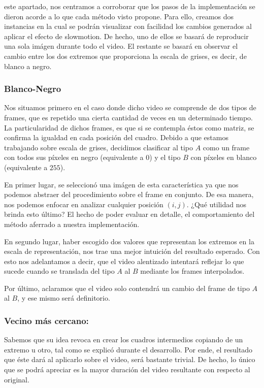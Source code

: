  este apartado, nos centramos a corroborar que los pasos de la implementaci\'on se dieron acorde a lo que cada m\'etodo visto propone. Para ello, creamos dos instancias en la cual se podr\'an visualizar con facilidad los cambios generados al aplicar el efecto de slowmotion. De hecho, uno de ellos se basar\'a de reproducir una sola im\'agen durante todo el video. El restante se basar\'a en observar el cambio entre los dos extremos que proporciona la escala de grises, es decir, de blanco a negro.
\subsubsection{Blanco-Negro}

Nos situamos primero en el caso donde dicho video se comprende de dos tipos de frames, que es repetido una cierta cantidad de veces en un determinado tiempo. La particularidad de dichos frames, es que si se contempla \'estos como matriz, se confirma la igualdad en cada posici\'on del cuadro. Debido a que estamos trabajando sobre escala de grises, decidimos clasificar al tipo $A$ como un frame con todos sus p\'ixeles en negro (equivalente a $0$) y el tipo $B$ con p\'ixeles en blanco (equivalente a $255$).

En primer lugar, se seleccion\'o una im\'agen de esta caracter\'istica ya que nos podemos abstraer del procedimiento sobre el frame en conjunto. De esa manera, nos podemos enfocar en analizar cualquier posici\'on $(i,j)$. ¿Qu\'e utilidad nos brinda esto \'ultimo? El hecho de poder evaluar en detalle, el comportamiento del m\'etodo aferrado a nuestra implementaci\'on.

En segundo lugar, haber escogido dos valores que representan los extremos en la escala de representaci\'on, nos trae una mejor intuici\'on del resultado esperado. Con esto nos adelantamos a decir, que el video alentizado intentar\'a reflejar lo que sucede cuando se translada del tipo $A$ al $B$ mediante los frames interpolados.

Por \'ultimo, aclaramos que el video solo contendr\'a un cambio del frame de tipo $A$ al $B$, y ese mismo ser\'a definitorio.

\subsubsection*{Vecino m\'as cercano:}

Sabemos que su idea revoca en crear los cuadros intermedios copiando de un extremo u otro, tal como se explic\'o durante el desarrollo. Por ende, el resultado que \'este dar\'a al aplicarlo sobre el video, ser\'a bastante trivial. De hecho, lo \'unico que se podr\'a apreciar es la mayor duraci\'on del video resultante con respecto al original.

